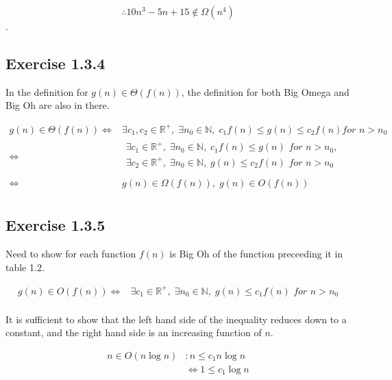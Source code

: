 \documentclass{article}
\newcommand\R{\mathbb{R}}
\begin{document}
\[\therefore 10n^3-5n+15 \notin \Omega(n^4)\].


\subsection*{Exercise 1.3.4}

In the definition for \(g(n) \in \Theta(f(n))\), the definition for both Big Omega and Big Oh are also in there. 

\begin{align*}
g(n) \in \Theta(f(n))  \iff & \exists c_1, c_2 \in \R^+,\;\exists n_0 \in \mathbb{N},\; c_1f(n) \leq g(n) \leq c_2f(n) \textit{for }  n > n_0 \\
\iff & 
	 \begin{array}{l} 
	 \exists c_1 \in \R^+,\;\exists n_0 \in \mathbb{N},\;c_1f(n) \leq g(n)\textit{ for }  n > n_0, \\ 
	 \exists c_2 \in \R^+,\;\exists n_0 \in \mathbb{N},\;g(n) \leq c_2f(n)\textit{ for }  n > n_0 \\
	 \end{array} \\
\iff & g(n) \in \Omega(f(n)),\;g(n) \in O(f(n)) \\ 
\end{align*}



\subsection*{Exercise 1.3.5}

Need to show for each function \(f(n)\) is Big Oh of the function preceeding it in table 1.2.

\begin{align*}
g(n) \in O(f(n))  \iff & \exists c_1 \in \R^+,\;\exists n_0 \in \mathbb{N},\;g(n) \leq c_1f(n)\textit{ for }  n > n_0 \\
\end{align*}
 
 It is sufficient to show that the left hand side of the inequality reduces down to a constant, and the right hand side is an increasing function of \(n\). 
 
 
 
\begin{align*}
n \in O(n\log{n})& : n \leq c_1n\log{n} \\
&\iff  1 \leq c_1\log{n}\\
\end{align*}
\end{document}

